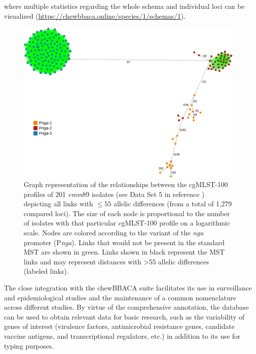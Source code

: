 where multiple statistics regarding the whole schema and individual loci can be visualized (\url{https://chewbbaca.online/species/1/schemas/1}).

\begin{figure}[!ht]
    \centering
    \includegraphics[width=\textwidth]{figures/chapter 4/Figure6.pdf}
    \caption[Graph representation of the relationships between the cgMLST-100 profiles of 201 \textit{emm}89 isolates, depicting all links with $\leq55$ allelic differences (from a total of 1,279 compared loci).]{Graph representation of the relationships between the cgMLST-100 profiles of 201 \textit{emm}89 isolates (see Data Set 5 in reference \cite{friaes_supplemental_2023}) depicting all links with $\leq55$ allelic differences (from a total of 1,279 compared loci). The size of each node is proportional to the number of isolates with that particular cgMLST-100 profile on a logarithmic scale. Nodes are colored according to the variant of the \textit{nga} promoter (P\textit{nga}). Links that would not be present in the standard \ac{MST} are shown in green. Links shown in black represent the \ac{MST} links and may represent distances with >55 allelic differences (labeled links).}
    \label{fig:chap4_figure6}
\end{figure}

The close integration with the chewBBACA suite \cite{silva_chewbbaca_2018} facilitates its use in surveillance and epidemiological studies and the maintenance of a common nomenclature across different studies. By virtue of the comprehensive annotation, the database can be used to obtain relevant data for basic research, such as the variability of genes of interest (virulence factors, antimicrobial resistance genes, candidate vaccine antigens, and transcriptional regulators, etc.) \cite{davies_atlas_2019, beres_integrative_2022} in addition to its use for typing purposes.

